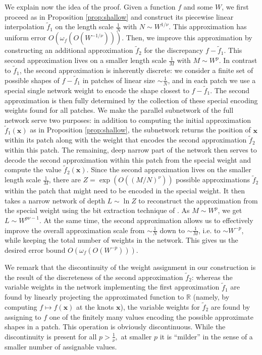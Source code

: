 \documentclass[final, 12pt]{colt2018}
\begin{document}
We explain now the idea of the proof. Given a function $f$ and some $W$, we first proceed as in Proposition \ref{prop:shallow} and construct its piecewise linear interpolation $\widetilde f_1$ on the length scale $\frac{1}{N}$ with $N\sim W^{1/\nu}$. This approximation has uniform error $O(\omega_f(O(W^{-1/\nu})))$. Then, we improve this approximation by constructing an additional approximation $\widetilde f_2$ for the discrepancy $f-\widetilde f_1$. This second approximation lives on a smaller length scale $\frac{1}{M}$ with $M\sim W^{p}$. In contrast to $\widetilde f_1$, the second approximation is inherently discrete: we consider a finite set of possible shapes of $f-\widetilde f_1$ in patches of linear size $\sim\frac{1}{N}$, and in each patch we use a special single network weight to encode the  shape closest to $f-\widetilde f_1$. The second approximation is then fully determined by the collection of these special encoding weights found for all patches. We make the  parallel subnetwork of the full network serve two purposes: in addition to computing the initial approximation $\widetilde f_1(\mathbf x)$ as in Proposition \ref{prop:shallow}, the subnetwork returns the position of $\mathbf x$ within its patch along with the weight that encodes the second approximation $\widetilde f_2$ within this patch. The remaining, deep narrow part of the network then serves to decode the second approximation within this patch from the special weight and compute the value $\widetilde f_2(\mathbf x)$. Since the second approximation lives on the smaller length scale $\frac{1}{M}$, there are $Z=\exp(O((M/N)^\nu))$ possible  approximations $\widetilde f_2$ within the patch that might need to be encoded in the special weight. It then takes a narrow network of depth $L\sim \ln Z$ to reconstruct the approximation from the special weight using the bit extraction technique of \cite{bartlett1998almost}. As $M\sim W^{p}$, we get $L\sim W^{p\nu-1}$. At the same time, the second approximation allows us to effectively improve the overall approximation scale from $\sim \frac{1}{N}$ down to $\sim \frac{1}{M}$, i.e. to $\sim W^{-p}$, while keeping the total number of weights in the network. This gives us the desired error bound $O(\omega_f(O(W^{-p}))).$ 

We remark that the discontinuity of the weight assignment in our construction is the result of the discreteness of the second approximation $\widetilde f_2$: whereas the variable weights in the network implementing the first approximation $\widetilde f_1$  are found by linearly projecting the approximated function to $\mathbb R$ (namely, by computing $f\mapsto f(\mathbf x)$ at the knots $\mathbf x$), the variable weights for $\widetilde f_2$ are found by assigning to $f$ one of the finitely many values encoding the possible approximate shapes in a patch. This operation is obviously discontinuous.  While the discontinuity is present for all $p>\frac{1}{\nu},$ at smaller $p$ it is ``milder'' in the sense of a smaller number of assignable values.
\end{document}
